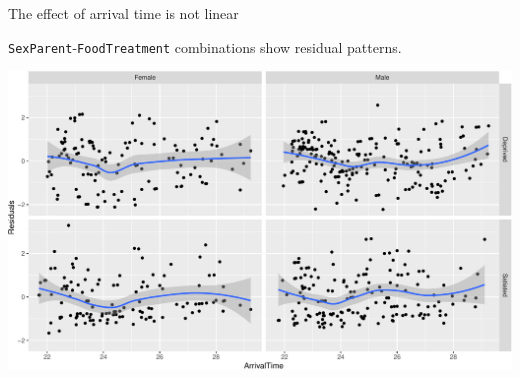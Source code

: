 \documentclass[
  ignorenonframetext,
]{beamer}
\newenvironment{Shaded}{\begin{snugshade}}{\end{snugshade}}
\newcommand{\DataTypeTok}[1]{\textcolor[rgb]{0.13,0.29,0.53}{#1}}
\newcommand{\KeywordTok}[1]{\textcolor[rgb]{0.13,0.29,0.53}{\textbf{#1}}}
\newcommand{\NormalTok}[1]{#1}
\newcommand{\OperatorTok}[1]{\textcolor[rgb]{0.81,0.36,0.00}{\textbf{#1}}}
\newcommand{\StringTok}[1]{\textcolor[rgb]{0.31,0.60,0.02}{#1}}
\begin{document}
\begin{frame}[fragile]{The effect of arrival time is not linear}
\protect\hypertarget{the-effect-of-arrival-time-is-not-linear}{}

\texttt{SexParent}-\texttt{FoodTreatment} combinations show residual
patterns.

\scriptsize

\begin{Shaded}
\end{Shaded}

\includegraphics{mixed_models_files/figure-beamer/unnamed-chunk-24-1.pdf}

\end{frame}
\end{document}
